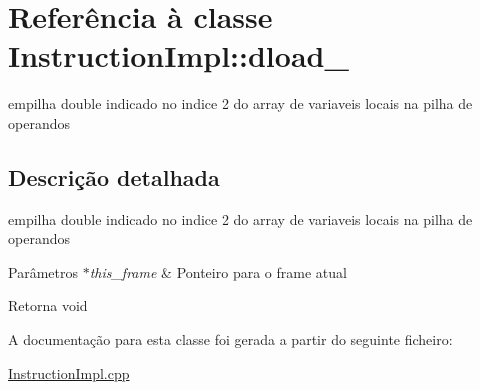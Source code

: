 \hypertarget{class_instruction_impl_1_1dload__2}{}\section{Referência à classe Instruction\+Impl\+:\+:dload\+\_}
\label{class_instruction_impl_1_1dload__2}


empilha double indicado no indice 2 do array de variaveis locais na pilha de operandos  




\subsection{Descrição detalhada}
empilha double indicado no indice 2 do array de variaveis locais na pilha de operandos 


\begin{DoxyParams}{Parâmetros}
{\em $\ast$this\+\_\+frame} & Ponteiro para o frame atual \\
\hline
\end{DoxyParams}
\begin{DoxyReturn}{Retorna}
void 
\end{DoxyReturn}


A documentação para esta classe foi gerada a partir do seguinte ficheiro\+:\begin{DoxyCompactItemize}
\item 
\hyperlink{_instruction_impl_8cpp}{Instruction\+Impl.\+cpp}\end{DoxyCompactItemize}
